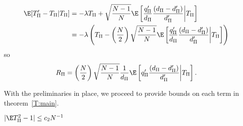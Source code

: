 \begin{align*}
  \E[T_{\Pi}'-T_{\Pi}|T_{\Pi}]
  &= - \lambda T_{\Pi} + \sqrt{\frac{N-1}{N}}
  \E\left [\frac{q_{\Pi}'}{d_{\Pi}} \frac{(d_{\Pi}-d_{\Pi}')}{d_{\Pi}'}\middle |T_{\Pi} \right ] \\
  &= - \lambda \left ( T_{\Pi} - \left ( \frac{N}{2} \right )
    \sqrt{\frac{N-1}{N}}
    \E\left [\frac{q_{\Pi}'}{d_{\Pi}} \frac{(d_{\Pi}-d_{\Pi}')}{d_{\Pi}'}\middle |T_{\Pi} \right ] \right )
\end{align*}
so
\begin{equation}
  \label{def:Rdef}
  R_{\Pi} = \left (\frac{N}{2}\right )\sqrt{\frac{N-1}{N}}\frac{1}{d_{\Pi}}\E
  \left [q_{\Pi}'\frac{(d_{\Pi}-d_{\Pi}')}{d_{\Pi}'} \middle | T_{\Pi} \right ].
\end{equation}

With the preliminaries in place, we proceed to provide bounds on each
term in theorem~\ref{T:main}.

\begin{proposition}
  \label{P:P1}
  $|\E T_{\Pi}^2 -1| \leq c_2 N^{-1}$
\end{proposition}

